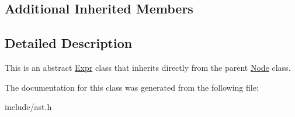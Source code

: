 \subsection*{Additional Inherited Members}


\subsection{Detailed Description}
This is an abstract \hyperlink{classfcal_1_1ast_1_1Expr}{Expr} class that inherits directly from the parent \hyperlink{classfcal_1_1ast_1_1Node}{Node} class. 

The documentation for this class was generated from the following file\+:\begin{DoxyCompactItemize}
\item 
include/ast.\+h\end{DoxyCompactItemize}
